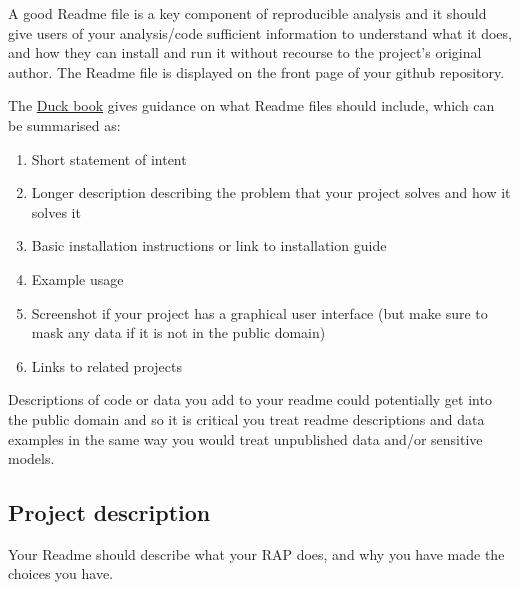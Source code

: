 \documentclass[
  letterpaper,
]{book}
\begin{document}
A good Readme file is a key component of reproducible analysis and it
should give users of your analysis/code sufficient information to
understand what it does, and how they can install and run it without
recourse to the project's original author. The Readme file is displayed
on the front page of your github repository.

The
\href{https://best-practice-and-impact.github.io/qa-of-code-guidance/intro.html\#}{Duck
book} gives guidance on what Readme files should include, which can be
summarised as:

\begin{enumerate}
\def\labelenumi{\arabic{enumi}.}
\item
  Short statement of intent
\item
  Longer description describing the problem that your project solves and
  how it solves it
\item
  Basic installation instructions or link to installation guide
\item
  Example usage
\item
  Screenshot if your project has a graphical user interface (but make
  sure to mask any data if it is not in the public domain)
\item
  Links to related projects
\end{enumerate}

Descriptions of code or data you add to your readme could potentially
get into the public domain and so it is critical you treat readme
descriptions and data examples in the same way you would treat
unpublished data and/or sensitive models.

\hypertarget{project-description}{%
\subsection{Project description}\label{project-description}}

Your Readme should describe what your RAP does, and why you have made
the choices you have.
\end{document}
